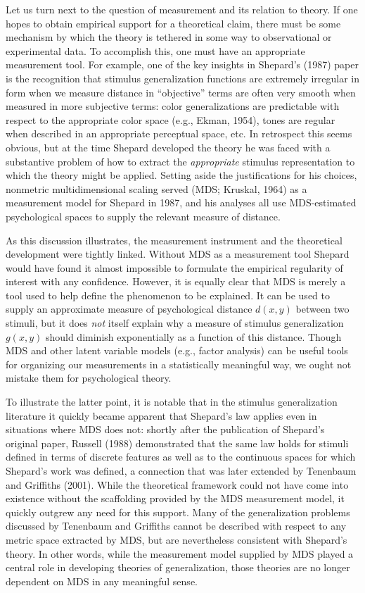 \documentclass[
  english,
  doc]{apa6}
\begin{document}
\noindent
Let us turn next to the question of measurement and its relation to theory. If one hopes to obtain empirical support for a theoretical claim, there must be some mechanism by which the theory is tethered in some way to observational or experimental data. To accomplish this, one must have an appropriate measurement tool. For example, one of the key insights in Shepard's (1987) paper is the recognition that stimulus generalization functions are extremely irregular in form when we measure distance in \enquote{objective} terms are often very smooth when measured in more subjective terms: color generalizations are predictable with respect to the appropriate color space (e.g., Ekman, 1954), tones are regular when described in an appropriate perceptual space, etc. In retrospect this seems obvious, but at the time Shepard developed the theory he was faced with a substantive problem of how to extract the \emph{appropriate} stimulus representation to which the theory might be applied. Setting aside the justifications for his choices, nonmetric multidimensional scaling served (MDS; Kruskal, 1964) as a measurement model for Shepard in 1987, and his analyses all use MDS-estimated psychological spaces to supply the relevant measure of distance.

As this discussion illustrates, the measurement instrument and the theoretical development were tightly linked. Without MDS as a measurement tool Shepard would have found it almost impossible to formulate the empirical regularity of interest with any confidence. However, it is equally clear that MDS is merely a tool used to help define the phenomenon to be explained. It can be used to supply an approximate measure of psychological distance \(d(x,y)\) between two stimuli, but it does \emph{not} itself explain why a measure of stimulus generalization \(g(x,y)\) should diminish exponentially as a function of this distance. Though MDS and other latent variable models (e.g., factor analysis) can be useful tools for organizing our measurements in a statistically meaningful way, we ought not mistake them for psychological theory.

To illustrate the latter point, it is notable that in the stimulus generalization literature it quickly became apparent that Shepard's law applies even in situations where MDS does not: shortly after the publication of Shepard's original paper, Russell (1988) demonstrated that the same law holds for stimuli defined in terms of discrete features as well as to the continuous spaces for which Shepard's work was defined, a connection that was later extended by Tenenbaum and Griffiths (2001). While the theoretical framework could not have come into existence without the scaffolding provided by the MDS measurement model, it quickly outgrew any need for this support. Many of the generalization problems discussed by Tenenbaum and Griffiths cannot be described with respect to any metric space extracted by MDS, but are nevertheless consistent with Shepard's theory. In other words, while the measurement model supplied by MDS played a central role in developing theories of generalization, those theories are no longer dependent on MDS in any meaningful sense.
\end{document}
